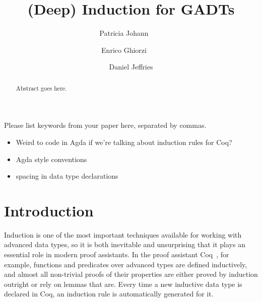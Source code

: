 \documentclass[9pt]{entcs}
\begin{document}
\begin{frontmatter}
  \title{(Deep) Induction for GADTs}

  \author{Patricia Johann~~~~}%
  \author{Enrico Ghiorzi~~~~}%
  \author{Daniel Jeffries}%
  \address{$\mathtt{\{johannp,ghiorzie,jeffriesd\}@appstate.edu}$\\Department of Computer Science, Appalachian State University}

\begin{abstract} 
  Abstract goes here.
\end{abstract}

\begin{keyword}
  Please list keywords from your paper here, separated by commas.
\end{keyword}

\end{frontmatter}

\begin{itemize}
\item Weird to code in Agda if we're talking about induction rules for
  Coq? 
\item Agda style conventions
 \item spacing in data type declarations
\end{itemize}
  
\section{Introduction}\label{sec:intro}

Induction is one of the most important techniques available for
working with advanced data types, so it is both inevitable and
unsurprising that it plays an essential role in modern proof
assistants. In the proof assistant Coq~\cite{coq20}, for example,
functions and predicates over advanced types are defined inductively,
and almost all non-trivial proofs of their properties are either
proved by induction outright or rely on lemmas that are. Every time a
new inductive data type is declared in Coq, an induction rule is
automatically generated for it.
\end{document}
